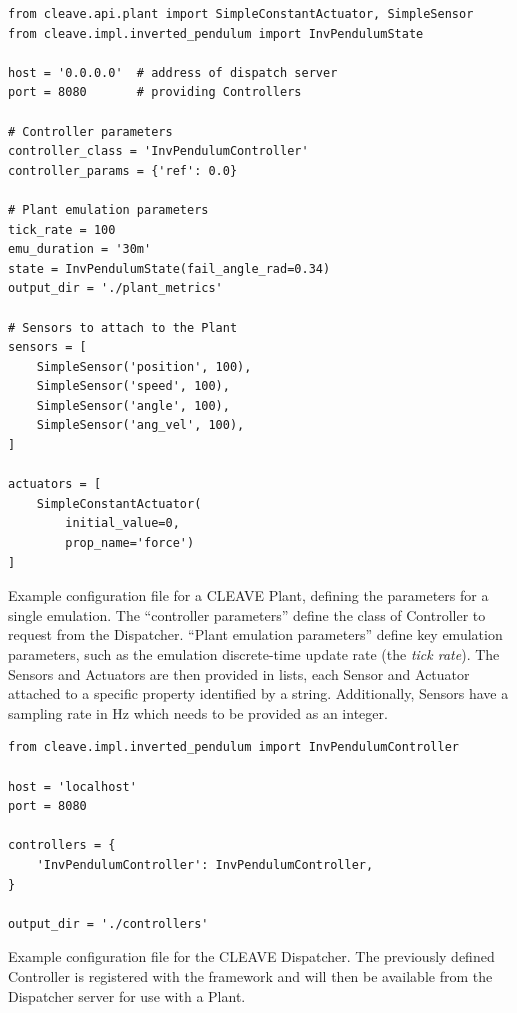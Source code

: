 \begin{listing}
    \begin{verbatim}
from cleave.api.plant import SimpleConstantActuator, SimpleSensor
from cleave.impl.inverted_pendulum import InvPendulumState

host = '0.0.0.0'  # address of dispatch server
port = 8080       # providing Controllers

# Controller parameters
controller_class = 'InvPendulumController'
controller_params = {'ref': 0.0}

# Plant emulation parameters
tick_rate = 100
emu_duration = '30m'
state = InvPendulumState(fail_angle_rad=0.34)
output_dir = './plant_metrics'

# Sensors to attach to the Plant
sensors = [
    SimpleSensor('position', 100),
    SimpleSensor('speed', 100),
    SimpleSensor('angle', 100),
    SimpleSensor('ang_vel', 100),
]

actuators = [
    SimpleConstantActuator(
        initial_value=0,
        prop_name='force')
]
    \end{verbatim}
    \caption{
        Example configuration file for a CLEAVE Plant, defining the parameters for a single emulation.
        The ``controller parameters'' define the class of Controller to request from the Dispatcher.
        ``Plant emulation parameters'' define key emulation parameters, such as the emulation discrete-time update rate (the \emph{tick rate}).
        The Sensors and Actuators are then provided in lists, each Sensor and Actuator attached to a specific property identified by a string.
        Additionally, Sensors have a sampling rate in Hz which needs to be provided as an integer.
    }
    \label{lst:config:plant}
\end{listing}

\begin{listing}
    \begin{verbatim}
from cleave.impl.inverted_pendulum import InvPendulumController

host = 'localhost'
port = 8080

controllers = {
    'InvPendulumController': InvPendulumController,
}

output_dir = './controllers'
    \end{verbatim}
    \caption{
        Example configuration file for the CLEAVE Dispatcher.
        The previously defined Controller is registered with the framework and will then be available from the Dispatcher server for use with a Plant.
    }
    \label{lst:config:dispatcher}
\end{listing}